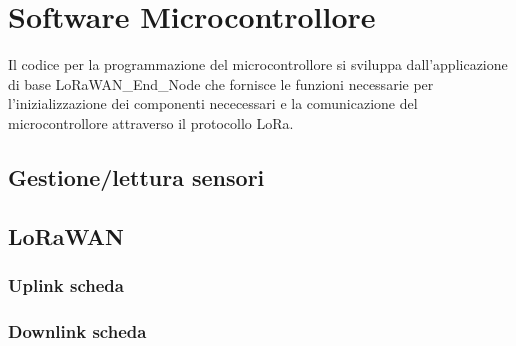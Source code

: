 \section{Software Microcontrollore}
Il codice per la programmazione del microcontrollore si sviluppa dall'applicazione di base LoRaWAN\_End\_Node che fornisce
le funzioni necessarie per l'inizializzazione dei componenti nececessari e la comunicazione del microcontrollore attraverso il protocollo LoRa.


\subsection{Gestione/lettura sensori}


\subsection{LoRaWAN}
  
  \subsubsection{Uplink scheda}


  \subsubsection{Downlink scheda}




